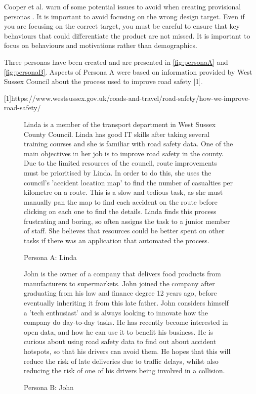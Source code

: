 \documentclass[authoryearcitations]{UoYCSproject}
\begin{document}
Cooper et al. warn of some potential issues to avoid when creating provisional personas \citep{Cooper2007}. It is important to avoid focusing on the wrong design target. Even if you are focusing on the correct target, you must be careful to ensure that key behaviours that could differentiate the product are not missed. It is important to focus on behaviours and motivations rather than demographics.

Three personas have been created and are presented in \autoref{fig:personaA} and \autoref{fig:personaB}. Aspects of Persona A were based on information provided by West Sussex Council about the process used to improve road safety [1].


[1]https://www.westsussex.gov.uk/roads-and-travel/road-safety/how-we-improve-road-safety/

\begin{figure}
	\begin{framed}
 		Linda is a member of the transport department in West Sussex County Council. Linda has good IT skills after taking several training courses and she is familiar with road safety data. One of the main objectives in her job is to improve road safety in the county. Due to the limited resources of the council, route improvements must be prioritised by Linda. In order to do this, she uses the council's 'accident location map' to find the number of casualties per kilometre on a route. This is a slow and tedious task, as she must manually pan the map to find each accident on the route before clicking on each one to find the details. Linda finds this process frustrating and boring, so often assigns the task to a junior member of staff. She believes that resources could be better spent on other tasks if there was an application that automated the process.
  	\end{framed}
  \caption{Persona A: Linda}
  \label{fig:personaA}
\end{figure}

\begin{figure}
	\begin{framed}
 		John is the owner of a company that delivers food products from manufacturers to supermarkets. John joined the company after graduating from his law and finance degree 12 years ago, before eventually inheriting it from this late father. John considers himself a 'tech enthusiast' and is always looking to innovate how the company do day-to-day tasks. He has recently become interested in open data, and how he can use it to benefit his business. He is curious about using road safety data to find out about accident hotspots, so that his drivers can avoid them. He hopes that this will reduce the risk of late deliveries due to traffic delays, whilst also reducing the risk of one of his drivers being involved in a collision. 	\end{framed}
  \caption{Persona B: John}
  \label{fig:personaB}
\end{figure}
\end{document}
